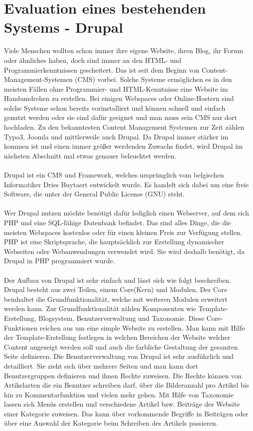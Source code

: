 \chapter{Evaluation eines bestehenden Systems - Drupal}
\label{JumpDrupal}

Viele Menschen wollten schon immer ihre eigene Website, ihren Blog, ihr Forum oder ähnliches haben, doch sind immer an den HTML- und Programmierkenntnissen gescheitert. Das ist seit dem Beginn von Content-Management-Systemen (CMS) vorbei. Solche Systeme ermöglichen es in den meisten Fällen ohne Programmier- und HTML-Kenntnisse eine Website im Handumdrehen zu erstellen. Bei einigen Webspaces oder Online-Hostern sind solche Systeme schon bereits vorinstalliert und können schnell und einfach genutzt werden oder sie sind dafür geeignet und man muss sein CMS nur dort hochladen. Zu den bekanntesten Content Management Systemen zur Zeit zählen Typo3, Joomla und mittlerweile auch Drupal. Da Drupal immer stärker im kommen ist und einen immer größer werdenden Zuwachs findet, wird Drupal im nächsten Abschnitt mal etwas genauer beleuchtet werden. \\
\\
Drupal ist ein CMS und Framework, welches ursprünglich vom belgischen Informatiker Dries Buytaert entwickelt wurde. Es handelt sich dabei um eine freie Software, die unter der General Public License (GNU) steht. \\
\\
Wer Drupal nutzen möchte benötigt dafür lediglich einen Webserver, auf dem sich PHP und eine SQL-fähige Datenbank befindet. Das sind alles Dinge, die die meisten Webspaces kostenlos oder für einen kleinen Preis zur Verfügung stellen. PHP ist eine Skriptsprache, die hauptsächlich zur Erstellung dynamischer Webseiten oder Webanwendungen verwendet wird. Sie wird deshalb benötigt, da Drupal in PHP programmiert wurde.\\
\\
Der Aufbau von Drupal ist sehr einfach und lässt sich wie folgt beschreiben. Drupal besteht aus zwei Teilen, einem Core(Kern) und Modulen. Der Core beinhaltet die Grundfunktionalität, welche mit weiteren Modulen erweitert werden kann. Zur Grundfunktionalität zählen Komponenten wie Template-Erstellung, Blogsystem, Benutzerverwaltung und Taxonomie. Diese Core-Funktionen reichen aus um eine simple Website zu erstellen. Man kann mit Hilfe der Template-Erstellung festlegen in welchen Bereichen der Website welcher Content angezeigt werden soll und auch die farbliche Gestaltung der gesamten Seite definieren. Die Benutzerverwaltung von Drupal ist sehr ausführlich und detailliert. Sie zieht sich über mehrere Seiten und man kann dort Benutzergruppen definieren und ihnen Rechte zuweisen. Die Rechte können von Artikelarten die ein Benutzer schreiben darf, über die Bilderanzahl pro Artikel bis hin zu Kommentarfunktion und vielen mehr gehen. Mit Hilfe von Taxonomie lassen sich Menüs erstellen und verschiedene Artikel bzw. Beiträge der Website einer Kategorie zuweisen. Das kann über vorkommende Begriffe in Beiträgen oder über eine Auswahl der Kategorie beim Schreiben des Artikels passieren. \\
